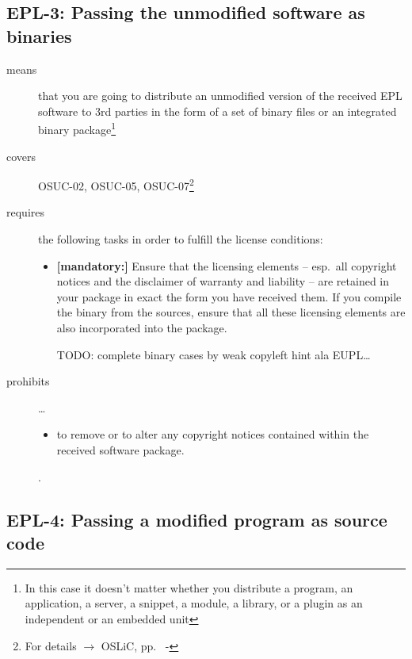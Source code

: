 \subsection{EPL-3: Passing the unmodified software as binaries} 

\begin{description}
\item[means] that you are going to distribute an unmodified version of the
received EPL software to 3rd parties in the form of a set of binary files or an
integrated bi\-na\-ry package\footnote{In this case it doesn't matter
whether you  distribute a program, an application, a server, a snippet, a
module, a library, or a plugin as an independent or an embedded unit}

\item[covers] OSUC-02, OSUC-05, OSUC-07\footnote{For details $\rightarrow$ OSLiC, pp.\
\pageref{OSUC-02-DEF} - \pageref{OSUC-07-DEF}}

\item[requires] the following tasks in order to fulfill the license conditions:
\begin{itemize}
  
  \item \textbf{[mandatory:]} Ensure that the licensing elements -- esp.\ all
  copyright notices and the disclaimer of warranty and liability -- are retained
  in your package in exact the form you have received them. If you compile the
  binary from the sources, ensure that all these licensing elements are also
  incorporated into the package.
  
  TODO: complete binary cases by weak copyleft hint ala EUPL\ldots
  
\end{itemize}

\item[prohibits] \ldots
\begin{itemize}
  \item to remove or to alter any copyright notices contained within the
  received software package.
\end{itemize}.

\end{description}

\subsection{EPL-4: Passing a modified program as source code}
\label{OSUC-04-EPL} 

